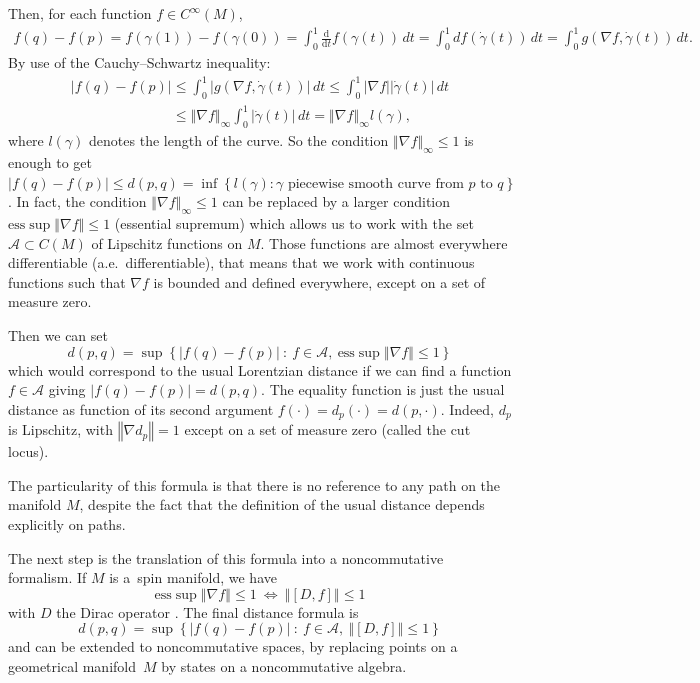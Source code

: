 \documentclass[pdftex]{sigma}
\newcommand{\norm}[1]{\left\Vert {#1} \right\Vert}
\newcommand{\abs}[1]{\left\vert {#1} \right\vert}
\newcommand{\set}[1]{\left\{ {#1} \right\}}
\newcommand{\dv}[2]{\frac{\mathrm d{#1}}{\mathrm d{#2}}}
\newcommand{\Lequi}{\Longleftrightarrow}
\begin{document}
Then, for each function $f \in C^\infty(M)$,
\begin{gather*}
f(q) - f(p) = f(\gamma(1)) - f(\gamma(0)) = \int_0^1 \dv{}{t} f(\gamma(t)) \, dt = \int_0^1 df(\dot\gamma(t)) \, dt = \int_0^1  g( \nabla f,\dot\gamma(t)) \, dt.
\end{gather*}
By use of the Cauchy--Schwartz inequality:
\begin{gather*}
\abs{ f(q) - f(p) } \leq \int_0^1  \abs{g( \nabla f,\dot\gamma(t))} \, dt \leq \int_0^1  \abs{ \nabla f} \abs{\dot\gamma(t)} \, dt \\
\phantom{\abs{ f(q) - f(p) }}{}
\leq \norm{  \nabla f}_\infty  \int_0^1  \abs{\dot\gamma(t)} \, dt = \norm{  \nabla f}_\infty l(\gamma),
\end{gather*}
where $l(\gamma)$ denotes the length of the curve. So the condition $\norm{  \nabla f}_\infty \leq 1$ is enough to get $\abs{ f(q) - f(p) } \leq d(p,q) = \inf\set{ l(\gamma) : \gamma \text{ piecewise smooth curve from $p$ to $q$}}$. In fact, the condition $\norm{  \nabla f}_\infty \leq 1$ can be replaced by a larger condition $\text{ess} \sup \norm{  \nabla f} \leq 1$ (essential supremum)  which allows us to work with the set $\mathcal A \subset C(M)$ of Lipschitz functions on $M$. Those functions are almost everywhere dif\/ferentiable  (a.e.~dif\/ferentiable), that means that we work with continuous functions such that $ \nabla f$ is bounded and def\/ined everywhere, except on a set of measure zero.

 Then we can set
\[
d(p,q) = \sup\set{  \abs{f(q)-f(p)} \ :\  f \in \mathcal A,\  \text{ess} \sup \norm{  \nabla f} \leq 1 }
\]
which would correspond to the usual Lorentzian distance if we can f\/ind a function $f\in\mathcal A$ giving $\abs{f(q)-f(p)} = d(p,q)$. The equality function is just the usual distance as function of its second argument $f(\cdot) = d_p(\cdot) = d(p,\cdot)$. Indeed, $d_p$ is Lipschitz, with $\norm{  \nabla d_p} = 1$ except on a set of measure zero (called the cut locus).

The particularity of this formula is that there is no reference to any path on the manifold $M$, despite the fact that the def\/inition of the usual distance depends explicitly on paths.

The next step is the translation of this formula into a noncommutative formalism. If $M$ is a~spin manifold, we have
\[
\text{ess} \sup \norm{  \nabla f} \leq 1\ \Lequi\ \norm{[D,f]} \leq 1
\]
 with $D$ the Dirac operator  \cite{C94,Var}. The f\/inal distance formula is
\[
d(p,q) = \sup\set{   \abs{f(q)-f(p)} \ :\  f \in \mathcal A,\  \norm{[D,f]}  \leq 1 }
\]
and can be extended to noncommutative spaces, by replacing points on a geometrical manifold~$M$ by states on a noncommutative algebra.
\end{document}
